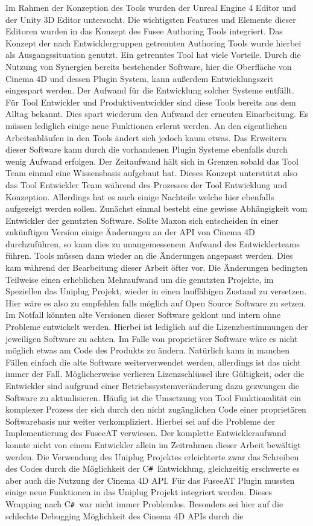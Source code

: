 \documentclass[pagesize, paper=a4, fontsize=12pt, titlepage=true, headings=small, headnosepline, abstractoff, liststotoc, nochapterprefix, plainheadsepline, twoside]{scrreprt}
\newcommand{\CSS}{C\texttt{\# }}
\begin{document}
Im Rahmen der Konzeption des Tools wurden der Unreal Engine 4 Editor und der Unity 3D Editor untersucht. Die wichtigsten Features und Elemente dieser Editoren wurden in das Konzept des Fusee Authoring Tools integriert. Das Konzept der nach Entwicklergruppen getrennten Authoring Tools wurde hierbei als Ausgangssituation genutzt. Ein getrenntes Tool hat viele Vorteile. Durch die Nutzung von Synergien bereits bestehender Software, hier die Oberfläche von Cinema 4D und dessen Plugin System, kann außerdem Entwicklungszeit eingespart werden. Der Aufwand für die Entwicklung solcher Systeme entfällt. Für Tool Entwickler und Produktiventwickler sind diese Tools bereits aus dem Alltag bekannt. Dies spart wiederum den Aufwand der erneuten Einarbeitung. Es müssen lediglich einige neue Funktionen erlernt werden. An den eigentlichen Arbeitsabläufen in den Tools ändert sich jedoch kaum etwas. Das Erweitern dieser Software kann durch die vorhandenen Plugin Systeme ebenfalls durch wenig Aufwand erfolgen. Der Zeitaufwand hält sich in Grenzen sobald das Tool Team einmal eine Wissensbasis aufgebaut hat. Dieses Konzept unterstützt also das Tool Entwickler Team während des Prozesses der Tool Entwicklung und Konzeption. Allerdings hat es auch einige Nachteile welche hier ebenfalls aufgezeigt werden sollen. Zunächst einmal besteht eine gewisse Abhängigkeit vom Entwickler der genutzten Software. Sollte Maxon sich entscheiden in einer zukünftigen Version einige Änderungen an der API von Cinema 4D durchzuführen, so kann dies zu unangemessenem Aufwand des Entwicklerteams führen. Tools müssen dann wieder an die Änderungen angepasst werden. Dies kam während der Bearbeitung dieser Arbeit öfter vor. Die Änderungen bedingten Teilweise einen erheblichen Mehraufwand um die genutzten Projekte, im Speziellen das Uniplug Projekt, wieder in einen lauffähigen Zustand zu versetzen. Hier wäre es also zu empfehlen falls möglich auf Open Source Software zu setzen. Im Notfall könnten alte Versionen dieser Software geklont und intern ohne Probleme entwickelt werden. Hierbei ist lediglich auf die Lizenzbestimmungen der jeweiligen Software zu achten. Im Falle von proprietärer Software wäre es nicht möglich etwas am Code des Produkts zu ändern. Natürlich kann in manchen Fällen einfach die alte Software weiterverwendet werden, allerdings ist das nicht immer der Fall. Möglicherweise verlieren Lizenzschlüssel ihre Gültigkeit, oder die Entwickler sind aufgrund einer Betriebssystemveränderung dazu gezwungen die Software zu aktualisieren. Häufig ist die Umsetzung von Tool Funktionalität ein komplexer Prozess der sich durch den nicht zugänglichen Code einer proprietären Softwarebasis nur weiter verkompliziert. Hierbei sei auf die Probleme der Implementierung des FuseeAT verwiesen. Der komplette Entwickleraufwand konnte nicht von einem Entwickler allein im Zeitrahmen dieser Arbeit bewältigt werden. Die Verwendung des Uniplug Projektes erleichterte zwar das Schreiben des Codes durch die Möglichkeit der \CSS Entwicklung, gleichzeitig erschwerte es aber auch die Nutzung der Cinema 4D API. Für das FuseeAT Plugin mussten einige neue Funktionen in das Uniplug Projekt integriert werden. Dieses Wrapping nach \CSS war nicht immer Problemlos. Besonders sei hier auf die schlechte Debugging Möglichkeit des Cinema 4D APIs durch die 
\end{document}
